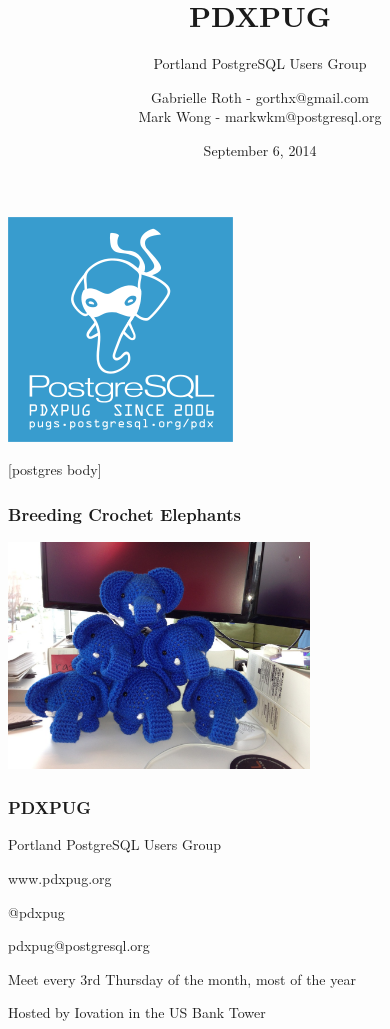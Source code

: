 \documentclass{beamer}
\title{PDXPUG}
\subtitle{Portland PostgreSQL Users Group}
\author[gorthx markwkm]{Gabrielle Roth - gorthx@gmail.com\\Mark Wong - markwkm@postgresql.org}
\date{September 6, 2014}
\begin{document}
\frame
{
  \begin{center}
  \includegraphics[scale=1]{pdxpug-logo.png}
  \end{center}
}

\frame{\titlepage}

[postgres body]


\frame
{
  \frametitle{Breeding Crochet Elephants}

  \begin{center}
  \includegraphics[width=8cm]{chelnik-pyramid.jpg}
  \end{center}
}

\frame
{
  \frametitle{PDXPUG}

  Portland PostgreSQL Users Group

  www.pdxpug.org

  @pdxpug

  pdxpug@postgresql.org

  Meet every 3rd Thursday of the month, most of the year

  Hosted by Iovation in the US Bank Tower
}
\end{document}
